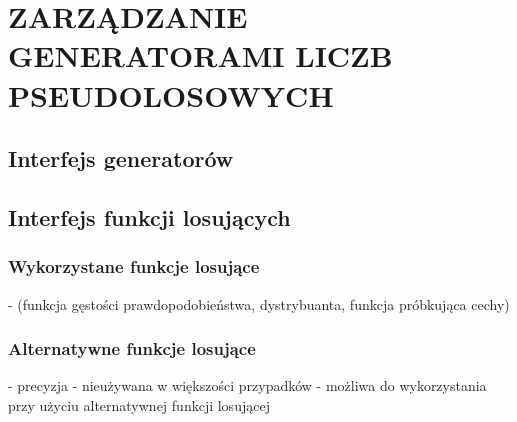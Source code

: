 \chapter{ZARZĄDZANIE GENERATORAMI LICZB PSEUDOLOSOWYCH}
\label{chpt:zarządzanie-generatorami-liczb-pseudolosowych}
\section{Interfejs generatorów}
\section{Interfejs funkcji losujących}
\subsection{Wykorzystane funkcje losujące}
- (funkcja gęstości prawdopodobieństwa, dystrybuanta, funkcja próbkująca cechy)
\subsection{Alternatywne funkcje losujące}

- precyzja
- nieużywana w większości przypadków
- możliwa do wykorzystania przy użyciu alternatywnej funkcji losującej
